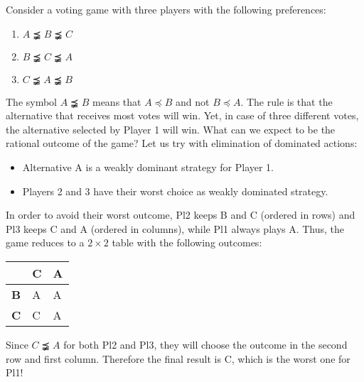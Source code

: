 \begin{example}
    Consider a voting game with three players with the following preferences: 
    \begin{enumerate}
        \item $A \precneqq B \precneqq C$
        \item $B \precneqq C \precneqq A$
        \item $C \precneqq A \precneqq B$
    \end{enumerate}
    The symbol $A \precneqq B$ means that $A \preceq B$ and not $B \preceq A$.
    The rule is that the alternative that receives most votes will win.
    Yet, in case of three different votes, the alternative selected by Player 1 will win.
    What can we expect to be the rational outcome of the game?
    Let us try with elimination of dominated actions:
    \begin{itemize}
        \item Alternative A is a weakly dominant strategy for Player 1. 
        \item Players 2 and 3 have their worst choice as weakly dominated strategy.
    \end{itemize}
    In order to avoid their worst outcome, Pl2 keeps B and C (ordered in rows) and Pl3 keeps C and A (ordered in columns), while Pl1 always plays A. Thus, the game reduces to a $2 \times 2$ table with the following outcomes:
    \begin{table}[H]
        \centering
        \begin{tabular}{l|ll|}
        \cline{2-3}
        \textbf{}                        & \textbf{C} & \textbf{A} \\ \hline
        \multicolumn{1}{|l|}{\textbf{B}} & A          & A          \\
        \multicolumn{1}{|l|}{\textbf{C}} & C          & A          \\ \hline
        \end{tabular}
    \end{table}
    Since $C \precneqq A$ for both Pl2 and Pl3, they will choose the outcome in the second row and first column. Therefore the final result is C, which is the worst one for Pl1!
\end{example}